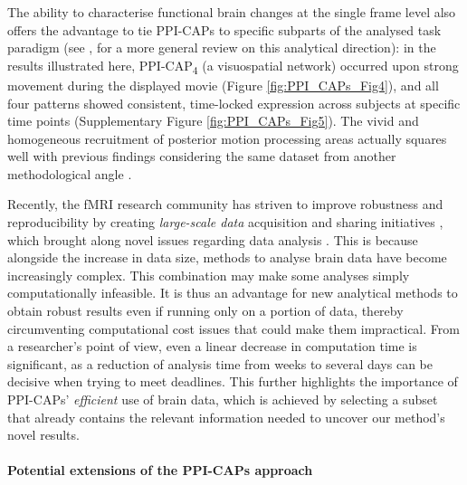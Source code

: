 The ability to characterise functional brain changes at the single frame level also offers the advantage to tie PPI-CAPs to specific subparts of the analysed task paradigm (see \citeauthor{Spiers2007a}, \citeyear{Spiers2007a} for a more general review on this analytical direction): in the results illustrated here, PPI-CAP\textsubscript{4} (a visuospatial network) occurred upon strong movement during the displayed movie (Figure \ref{fig:PPI_CAPs_Fig4}), and all four patterns showed consistent, time-locked expression across subjects at specific time points (Supplementary Figure \ref{fig:PPI_CAPs_Fig5}). The vivid and homogeneous recruitment of posterior motion processing areas actually squares well with previous findings considering the same dataset from another methodological angle \citep{Bolton2018}.


Recently,  the fMRI research community has striven to improve robustness and reproducibility by creating \textit{large-scale data}  acquisition and sharing initiatives \citep{VanEssen2013,Poldrack2013, VanHorn2014},  which brought along novel issues regarding data analysis \citep{Smith2018,Choudhury2014}. This is because alongside the increase in data size, methods to analyse brain data have become increasingly complex. This combination may make some analyses simply computationally infeasible. It is thus an advantage for new analytical methods to obtain robust results even if running only on a portion of data, thereby circumventing computational cost issues that could make them impractical. From a researcher's point of view, even a linear decrease in computation time is significant, as a reduction of analysis time from weeks to several days can be decisive when trying to meet deadlines. This further highlights the importance of PPI-CAPs' \textit{efficient} use of brain data, which is achieved by selecting a subset that already contains the relevant information needed to uncover our method's novel results.  



\paragraph{Potential extensions of the PPI-CAPs approach}\label{sec:extensions_ppicaps}

